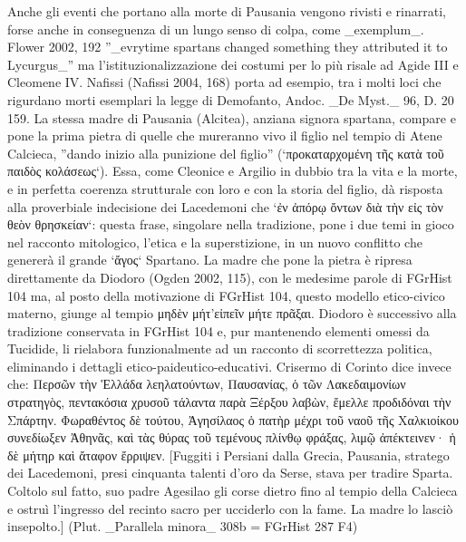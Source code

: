             Anche gli eventi che portano alla morte di Pausania  vengono rivisti e rinarrati, forse anche in conseguenza di un lungo senso di colpa, come _exemplum_. Flower 2002, 192 ''_evrytime spartans changed something they attributed it to Lycurgus_'' ma l'istituzionalizzazione dei costumi per lo più risale ad Agide III e Cleomene IV. Nafissi (Nafissi 2004, 168) porta ad esempio, tra i molti loci che rigurdano morti esemplari la legge di Demofanto, Andoc. _De Myst._ 96, D. 20 159. La stessa madre di Pausania  (Alcitea), anziana signora spartana, compare e pone la prima pietra di quelle che mureranno vivo il figlio nel tempio di Atene Calcieca, ''dando inizio alla punizione del figlio''  (`προκαταρχομένη τῆς κατὰ τοῦ παιδὸς κολάσεως`). Essa, come Cleonice e Argilio  in dubbio tra la vita e la morte, e in perfetta coerenza strutturale con loro e con la storia del figlio, dà risposta alla proverbiale indecisione dei Lacedemoni che `ἐν ἀπόρῳ ὄντων διὰ τὴν εἰς τὸν θεὸν θρησκείαν`: questa frase, singolare nella tradizione, pone i due temi in gioco nel racconto mitologico, l'etica e la superstizione, in un nuovo conflitto che genererà il grande `ἄγος` Spartano. La madre che pone la pietra è ripresa direttamente da  Diodoro (Ogden 2002, 115), con le medesime parole di FGrHist 104 ma, al posto della motivazione di FGrHist 104, questo modello etico-civico materno, giunge al tempio \textgreek{μηδὲν μήτ'εἰπεῖν μήτε πρᾶξαι}.  Diodoro è successivo alla tradizione conservata in FGrHist 104 e, pur mantenendo elementi omessi da Tucidide, li rielabora funzionalmente ad un racconto di scorrettezza politica, eliminando i dettagli etico-paideutico-educativi.  Crisermo di Corinto dice invece che: \textgreek{Περσῶν τὴν Ἑλλάδα λεηλατούντων, Παυσανίας, ὁ τῶν Λακεδαιμονίων στρατηγὸς, πεντακόσια χρυσοῦ τάλαντα παρὰ Ξέρξου λαβὼν, ἔμελλε προδιδόναι τὴν Σπάρτην. Φωραθέντος δὲ τούτου, Ἀγησίλαος ὁ πατὴρ μέχρι τοῦ ναοῦ τῆς Χαλκιοίκου συνεδίωξεν Ἀθηνᾶς, καὶ τὰς θύρας τοῦ τεμένους πλίνθῳ φράξας, λιμῷ ἀπέκτεινεν· ἡ δὲ μήτηρ καὶ ἄταφον ἔρριψεν.}  [Fuggiti i Persiani dalla Grecia, Pausania, stratego dei Lacedemoni, presi cinquanta talenti d'oro da Serse, stava per tradire Sparta. Coltolo sul fatto, suo padre Agesilao gli corse dietro fino al tempio della Calcieca e ostruì l'ingresso del recinto sacro per ucciderlo con la fame. La madre lo lasciò insepolto.] (Plut. _Parallela minora_ 308b = FGrHist 287 F4)
